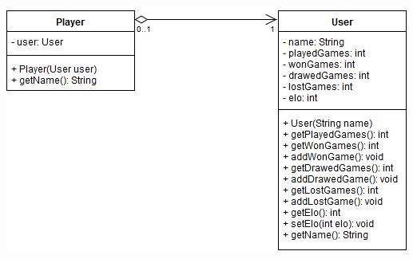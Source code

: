 \documentclass[parskip=full]{scrartcl}
\begin{document}
\begin{minipage}{\linewidth}
			\centering
			\includegraphics[width=1\linewidth]{Diagramme/Player}
			\label{fig:player}
		\end{minipage}
\end{document}
